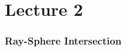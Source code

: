 \documentclass[../pbr.tex]{subfile}
\begin{document}
\part{Lecture 2}%
\label{prt:lecture_2}

\section{Ray-Sphere Intersection}%
\label{sec:ray_sphere_intersection}
\end{document}
